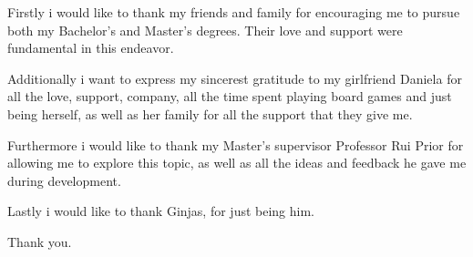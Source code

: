 



\begin{acknowledgements}

Firstly i would like to thank my friends and family for encouraging me to pursue both my Bachelor's and Master's degrees. 
Their love and support were fundamental in this endeavor.

Additionally i want to express my sincerest gratitude to my girlfriend Daniela for all the love, support, company, all 
the time spent playing board games and just being herself, as well as her family for all the support that they give me.

Furthermore i would like to thank my Master's supervisor Professor Rui Prior for allowing me to explore this topic, as well 
as all the ideas and feedback he gave me during development.

Lastly i would like to thank Ginjas, for just being him.

Thank you.

\vspace*{10cm}
\newfontfamily{}

\end{acknowledgements}


